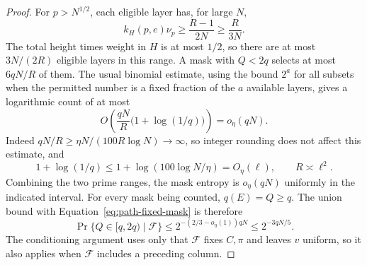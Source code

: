 \begin{proof}
For \(p>N^{1/2}\), each eligible layer has, for large \(N\),
\[
 k_H(p,e)\nu_p\ge\frac{R-1}{2N}\ge\frac{R}{3N}.
\]
The total height times weight in \(H\) is at most \(1/2\), so there are
at most \(3N/(2R)\) eligible layers in this range. A mask with \(Q<2q\)
selects at most \(6qN/R\) of them. The usual binomial estimate, using
the bound \(2^a\) for all subsets when the permitted number is a
fixed fraction of the \(a\) available layers, gives a logarithmic
count of at most
\[
 O\left(\frac{qN}{R}\bigl(1+\log(1/q)\bigr)\right)=o_\eta(qN).
\]
Indeed \(qN/R\ge\eta N/(100R\log N)\to\infty\), so integer rounding
does not affect this estimate, and
\[
 1+\log(1/q)\le 1+\log(100\log N/\eta)=O_\eta(\ell),
 \qquad R\asymp\ell^2.
\]
Combining the two prime ranges, the mask entropy is \(o_\eta(qN)\)
uniformly in the indicated interval. For every mask being counted,
\(q(E)=Q\ge q\). The union bound with
Equation~\eqref{eq:path-fixed-mask} is therefore
\[
 \Pr\{Q\in[q,2q)\mid\mathcal F\}
 \le 2^{-(2/3-o_\eta(1))qN}\le2^{-3qN/5}.
\]
The conditioning argument uses only that \(\mathcal F\) fixes \(C,\pi\)
and leaves \(v\) uniform, so it also applies when \(\mathcal F\) includes
a preceding column.
\end{proof}

